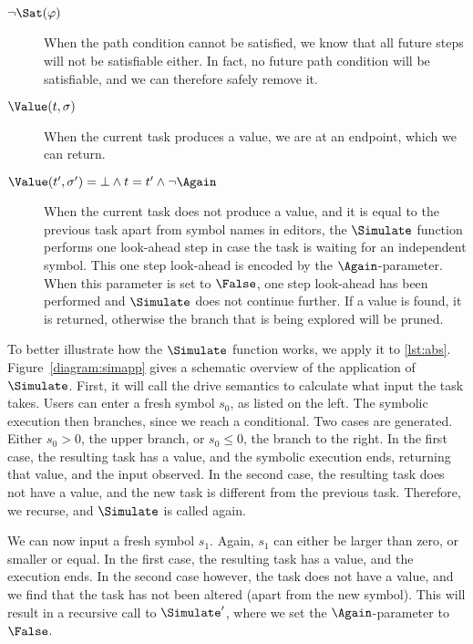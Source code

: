 \begin{description}
  \item[$\neg\Sat(\phi)$]
    When the path condition cannot be satisfied, we know that all future steps will not be satisfiable either.
    In fact, no future path condition will be satisfiable, and we can therefore safely remove it.

  \item[$\Value(t,\sigma)$]
    When the current task produces a value, we are at an endpoint, which we can return.

  \item[$\Value(t',\sigma')=\bot\land t=t'\land \neg \Again$]
    When the current task does not produce a value, and it is equal to the previous task apart from symbol names in editors,
    the $\Simulate$ function performs one look-ahead step in case the task is waiting for an independent symbol.
    This one step look-ahead is encoded by the $\Again$-parameter.
    When this parameter is set to $\False$, one step look-ahead has been performed and $\Simulate$ does not continue further.
    If a value is found, it is returned, otherwise the branch that is being explored will be pruned.
\end{description}

To better illustrate how the $\Simulate$ function works, we apply it to \cref{lst:abs}.
Figure~\ref{diagram:simapp} gives a schematic overview of the application of $\Simulate$.
First, it will call the drive semantics to calculate what input the task takes.
Users can enter a fresh symbol $s_0$, as listed on the left.
The symbolic execution then branches, since we reach a conditional.
Two cases are generated. Either $s_0>0$, the upper branch, or $s_0\leq0$, the  branch to the right.
In the first case, the resulting task has a value, and the symbolic execution ends, returning that value, and the input observed.
In the second case, the resulting task does not have a value, and the new task is different from the previous task.
Therefore, we recurse, and $\Simulate$ is called again.

We can now input a fresh symbol $s_1$. Again, $s_1$ can either be larger than zero, or smaller or equal.
In the first case, the resulting task has a value, and the execution ends.
In the second case however, the task does not have a value, and we find that the task has not been altered (apart from the new symbol).
This will result in a recursive call to $\Simulate'$, where we set the $\Again$-parameter to $\False$.

